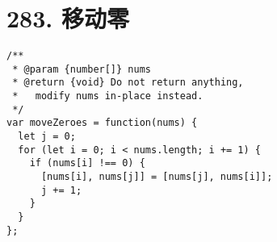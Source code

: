 \newpage
\section{283. 移动零}
\label{leetcode:283}

\begin{verbatim}
/**
 * @param {number[]} nums
 * @return {void} Do not return anything, 
 *   modify nums in-place instead.
 */
var moveZeroes = function(nums) {
  let j = 0;
  for (let i = 0; i < nums.length; i += 1) {
    if (nums[i] !== 0) {
      [nums[i], nums[j]] = [nums[j], nums[i]];
      j += 1;
    }
  }
};
\end{verbatim}
